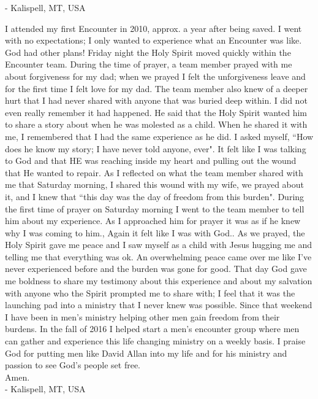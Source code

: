 \documentclass[oneside,12pt]{book}
\begin{document}
- Kalispell, MT, USA
\clearpage

I attended my first Encounter in 2010, approx. a year after being saved. I went with no expectations; I only wanted to experience what an Encounter was like. God had other plans!
Friday night the Holy Spirit moved quickly within the Encounter team. During the time of prayer, a team member prayed with me about forgiveness for my dad; when we prayed I felt the unforgiveness leave and for the first time I felt love for my dad. The team member also knew of a deeper hurt that I had never shared with anyone that was buried deep within. I did not even really remember it had happened. He said that the Holy Spirit wanted him to share a story about when he was molested as a child. When he shared it with me, I remembered that I had the same experience as he did. I asked myself, ``How does he know my story; I have never told anyone, ever". It felt like I was talking to God and that HE was reaching inside my heart and pulling out the wound that He wanted to repair.
As I reflected on what the team member shared with me that Saturday morning, I shared this wound with my wife, we prayed about it, and I knew that ``this day was the day of freedom from this burden".
During the first time of prayer on Saturday morning I went to the team member to tell him about my experience. As I approached him for prayer it was as if he knew why I was coming to him., Again it felt like I was with God.. As we prayed, the Holy Spirit gave me peace and I saw myself as a child with Jesus hugging me and telling me that everything was ok. An overwhelming peace came over me like I've never experienced before and the burden was gone for good.
That day God gave me boldness to share my testimony about this experience and about my salvation with anyone who the Spirit prompted me to share with; I feel that it was the launching pad into a ministry that I never knew was possible.
Since that weekend I have been in men's ministry helping other men gain freedom from their burdens. In the fall of 2016 I helped start a men's encounter group where men can gather and experience this life changing ministry on a weekly basis.
I praise God for putting men like David Allan into my life and for his ministry and passion to see God's people set free.\\

Amen. \\

- Kalispell, MT, USA
\clearpage
\end{document}
